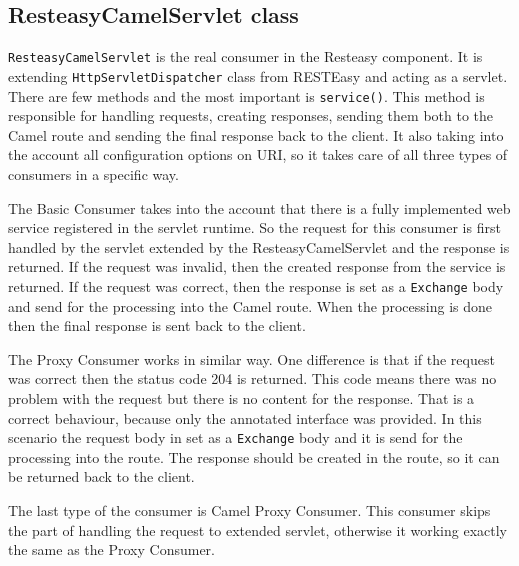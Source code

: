 \documentclass[12pt,final,oneside]{fithesis2}
\begin{document}
\subsection{ResteasyCamelServlet class}\label{servlet}
\texttt{ResteasyCamelServlet} is the real consumer in the Resteasy component. It is extending \texttt{HttpServletDispatcher} class from RESTEasy and acting as a servlet. There are few methods and the most important is \texttt{service()}. This method is responsible for handling requests, creating responses, sending them both to the Camel route and sending the final response back to the client. It also taking into the account all configuration options on URI, so it takes care of all three types of consumers in a specific way. 

The Basic Consumer takes into the account that there is a fully implemented web service registered in the servlet runtime. So the request for this consumer is first handled by the servlet extended by the ResteasyCamelServlet and the response is returned. If the request was invalid, then the created response from the service is returned. If the request was correct, then the response is set as a \texttt{Exchange} body and send for the processing into the Camel route. When the processing is done then the final response is sent back to the client. 

The Proxy Consumer works in similar way. One difference is that if the request was correct then the status code 204 is returned. This code means there was no problem with the request but there is no content for the response. That is a correct behaviour, because only the annotated interface was provided. In this scenario the request body in set as a \texttt{Exchange} body and it is send for the processing into the route. The response should be created in the route, so it can be returned back to the client.

The last type of the consumer is Camel Proxy Consumer. This consumer skips the part of handling the request to extended servlet, otherwise it working exactly the same as the Proxy Consumer.     
\end{document}
